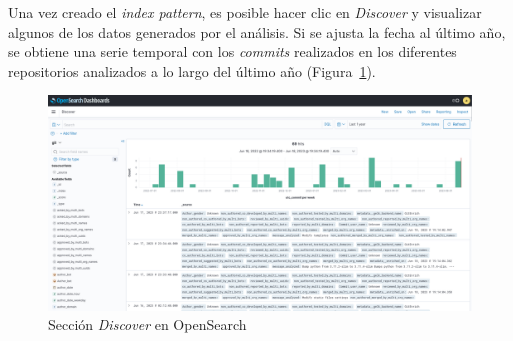 Una vez creado el \emph{index pattern}, es posible hacer clic en \emph{Discover} y visualizar algunos de los datos generados por el análisis. Si se ajusta la fecha al último año, se obtiene una serie temporal con los \emph{commits} realizados en los diferentes repositorios analizados a lo largo del último año (Figura~\ref{fig:opensearch-discover}).

\begin{figure}[ht]
    \centering
    \includegraphics[width=\textwidth]{Figures/opensearch-discover.png}
    \decoRule
    \caption[OpenSearch (Sección \emph{Discover})]{Sección \emph{Discover} en OpenSearch}
    \label{fig:opensearch-discover}
\end{figure}
